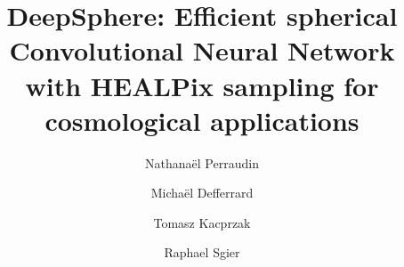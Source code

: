 \documentclass[final,twocolumn,3p,times,sort&compress]{elsarticle}
\newcommand{\1}{\b{1}}              %
\newcommand{\0}{\b{0}}              %
\begin{document}
\begin{frontmatter}



\title{DeepSphere: Efficient spherical Convolutional Neural Network with HEALPix sampling for cosmological applications}


\author[SDSC]{Nathanaël Perraudin}
\author[EPFL]{Michaël Defferrard}
\author[ETHZ]{Tomasz Kacprzak}
\author[ETHZ]{Raphael Sgier}

\address[SDSC]{Swiss Data Science Center (SDSC), Zurich, Switzerland}
\address[EPFL]{Institute of Electrical Engineering, EPFL, Lausanne, Switzerland}
\address[ETHZ]{Institute for Particle Physics and Astrophysics, ETH Zurich, Switzerland}

\begin{abstract}


\end{abstract}
\end{frontmatter}
\end{document}
